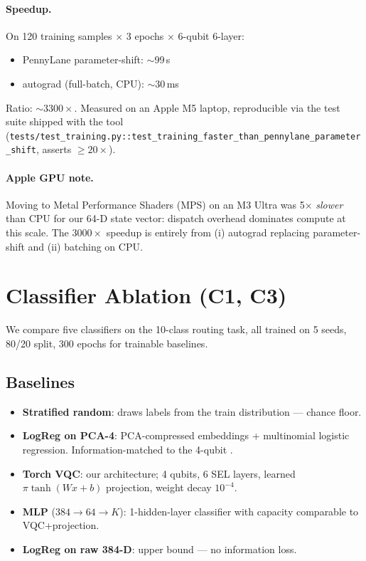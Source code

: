 \paragraph{Speedup.} On 120 training samples $\times$ 3 epochs $\times$ 6-qubit 6-layer:
\begin{itemize}
\item PennyLane parameter-shift: $\sim$99\,s
\item \torchvqc{} autograd (full-batch, CPU): $\sim$30\,ms
\end{itemize}
Ratio: $\sim$$3300\times$. Measured on an Apple M5 laptop, reproducible via the test suite shipped with the tool (\texttt{tests/test\_training.py::test\_training\_faster\_than\_pennylane\_parameter\_shift}, asserts $\geq 20\times$).

\paragraph{Apple GPU note.} Moving to Metal Performance Shaders (MPS) on an M3 Ultra was 5$\times$ \emph{slower} than CPU for our 64-D state vector: dispatch overhead dominates compute at this scale. The $3000\times$ speedup is entirely from (i) autograd replacing parameter-shift and (ii) batching on CPU.



\section{Classifier Ablation (C1, C3)}\label{sec:c1}

We compare five classifiers on the 10-class routing task, all trained on 5 seeds, 80/20 split, 300 epochs for trainable baselines.

\subsection{Baselines}
\begin{itemize}
\item \textbf{Stratified random}: draws labels from the train distribution --- chance floor.
\item \textbf{LogReg on PCA-4}: PCA-compressed embeddings + multinomial logistic regression. Information-matched to the 4-qubit \vqc.
\item \textbf{Torch VQC}: our architecture; 4 qubits, 6 SEL layers, learned $\pi \tanh(Wx+b)$ projection, weight decay $10^{-4}$.
\item \textbf{MLP} ($384 \to 64 \to K$): 1-hidden-layer classifier with capacity comparable to VQC+projection.
\item \textbf{LogReg on raw 384-D}: upper bound --- no information loss.
\end{itemize}

